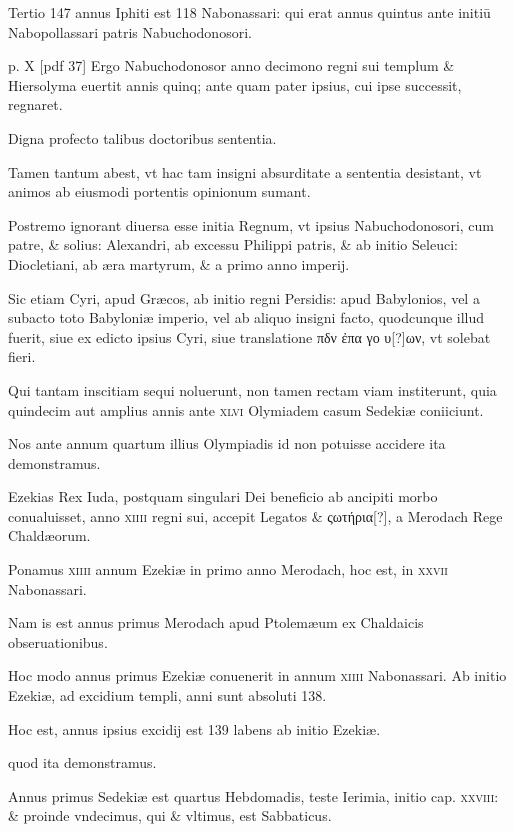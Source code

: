 \begin{parnumbers}
Tertio 147 annus
Iphiti est 118 Nabonassari: qui erat annus quintus ante initiū Nabopollassari
patris Nabuchodonosori.

\clearpage
p. X [pdf 37]
Ergo Nabuchodonosor anno
decimono regni sui templum \& Hiersolyma euertit annis quinq;
ante quam pater ipsius, cui ipse successit, regnaret.

Digna profecto
talibus doctoribus sententia.

Tamen tantum abest, vt hac tam insigni
absurditate a sententia desistant, vt animos ab eiusmodi portentis
opinionum sumant.

Postremo ignorant diuersa esse initia Regnum,
vt ipsius Nabuchodonosori, cum patre, \& solius: Alexandri,
ab excessu Philippi patris, \& ab initio Seleuci: Diocletiani, ab æra
martyrum, \& a primo anno imperij.

Sic etiam Cyri, apud Græcos, ab
initio regni Persidis: apud Babylonios, vel a subacto toto Babyloniæ
imperio, vel ab aliquo insigni facto, quodcunque illud fuerit, siue
ex edicto ipsius Cyri, siue translatione \textgreek{πδν ἐπα γο υ[?]ων},
vt solebat fieri.

Qui tantam inscitiam sequi noluerunt, non tamen rectam viam
institerunt, quia quindecim aut amplius annis ante \textsc{xlvi} Olymiadem
casum Sedekiæ coniiciunt.

Nos ante annum quartum illius
Olympiadis id non potuisse accidere ita demonstramus. 

Ezekias
Rex Iuda, postquam singulari Dei beneficio ab ancipiti morbo conualuisset,
anno \textsc{xiiii} regni sui, accepit Legatos \& \textgreek{ςωτήρια[?]}, a
Merodach Rege Chaldæorum.

Ponamus \textsc{xiiii} annum Ezekiæ in
primo anno Merodach, hoc est, in \textsc{xxvii} Nabonassari.

Nam is est
annus primus Merodach apud Ptolemæum ex Chaldaicis obseruationibus. 

Hoc modo annus primus Ezekiæ conuenerit in annum
\textsc{xiiii} Nabonassari. Ab initio Ezekiæ, ad excidium templi, anni
sunt absoluti 138.

Hoc est, annus ipsius excidij est 139 labens ab initio
Ezekiæ.

quod ita demonstramus. 

Annus primus Sedekiæ est
quartus Hebdomadis, teste Ierimia, initio cap. \textsc{xxviii}: \& proinde
vndecimus, qui \& vltimus, est Sabbaticus. 


\end{parnumbers}

